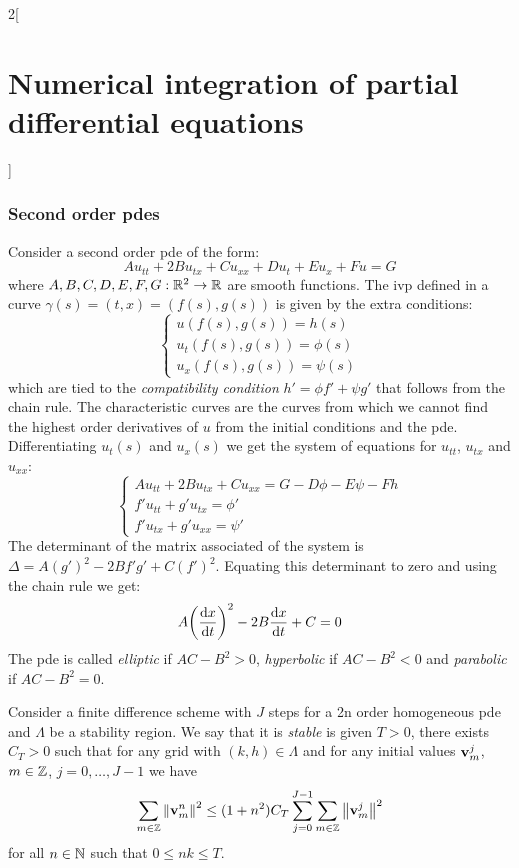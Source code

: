 \documentclass[../../../main_math.tex]{subfiles}
\begin{document}
\begin{multicols}{2}[\section{Numerical integration of partial differential equations}]
  \subsubsection{Second order pdes}
  \begin{definition}
    Consider a second order pde of the form:
    \begin{equation}
      A u_{tt}+2Bu_{tx} +Cu_{xx}+Du_t+Eu_x+F u=G
    \end{equation}
    where $A,B,C,D,E,F,G:\mathbb{R}^2\rightarrow\mathbb{R}$ are smooth functions. The ivp defined in a curve $\gamma(s)=(t,x)=(f(s),g(s))$ is given by the extra conditions:
    $$
      \begin{cases}
        u(f(s),g(s))=h(s)      \\
        u_t(f(s),g(s))=\phi(s) \\
        u_x(f(s),g(s))=\psi(s)
      \end{cases}
    $$
    which are tied to the \emph{compatibility condition} $h'=\phi f'+\psi g'$ that follows from the chain rule. The characteristic curves are the curves from which we cannot find the highest order derivatives of $u$ from the initial conditions and the pde. Differentiating $u_t(s)$ and $u_x(s)$ we get the system of equations for $u_{tt}$, $u_{tx}$ and $u_{xx}$:
    \begin{equation*}
      \begin{cases}
        A u_{tt}+2Bu_{tx} +Cu_{xx}=G-D\phi-E\psi -Fh \\
        f'u_{tt}+g'u_{tx}=\phi'                      \\
        f'u_{tx}+g'u_{xx}=\psi'
      \end{cases}
    \end{equation*}
    The determinant of the matrix associated of the system is $\Delta=A{(g')}^2-2Bf'g'+C{(f')}^2$. Equating this determinant to zero and using the chain rule we get:
    $$
      A{\left(\dv{x}{t}\right)}^2-2B\dv{x}{t}+C=0
    $$
    The pde is called \emph{elliptic} if $AC-B^2>0$, \emph{hyperbolic} if $AC-B^2<0$ and \emph{parabolic} if $AC-B^2=0$.
  \end{definition}
  \begin{definition}
    Consider a finite difference scheme with $J$ steps for a 2n order homogeneous pde and $\Lambda$ be a stability region. We say that it is \emph{stable} is given $T>0$, there exists $C_T>0$ such that for any grid with $(k,h)\in \Lambda$ and for any initial values $\boldsymbol{\mathrm{v}}_m^j$, $m\in\mathbb{Z}$, $j=0,\ldots,J-1$ we have $$\sum_{m\in\mathbb{Z}}\left\|\boldsymbol{\mathrm{v}}_m^n\right\|^2\leq (1+n^2)C_T\sum_{j=0}^{J-1}\sum_{m\in\mathbb{Z}}\left\|\boldsymbol{\mathrm{v}}_m^j\right\|^2$$ for all $n\in\mathbb{N}$ such that $0\leq nk\leq T$.

\end{definition}
\end{multicols}
\end{document}
